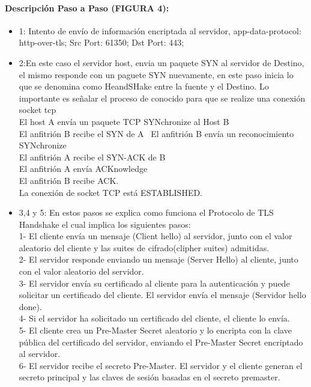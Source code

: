\documentclass[letterpaper]{article}
\begin{document}
\paragraph{Descripción Paso a Paso (FIGURA 4):}
\begin{itemize}
				
\item{1: Intento de envío de información encriptada al servidor, app-data-protocol: http-over-tls; Src Port: 61350; Dst Port: 443; }

\item{2:En este caso el servidor host, envia un paquete SYN al servidor de Destino, el mismo responde con un paguete SYN nuevamente, en este paso inicia lo que se denomina como HeandSHake entre la fuente y el Destino. Lo importante es señalar el proceso de conocido para que se realize una conexión socket tcp \\
El host A envía un paquete TCP SYNchronize al Host B \\
El anfitrión B recibe el SYN de A \
El anfitrión B envía un reconocimiento SYNchronize \\
El anfitrión A recibe el SYN-ACK de B \\
El anfitrión A envía ACKnowledge \\
El anfitrión B recibe ACK. \\
La conexión de socket TCP está ESTABLISHED. \\
}
\item{3,4 y 5: En estos pasos se explica como funciona el  Protocolo de TLS Handshake el cual implica los siguientes pasos:\\
1- El cliente envía un mensaje (Client hello) al servidor, junto con el valor aleatorio del cliente y las suites de cifrado(clipher suites) admitidas.\\
2- El servidor responde enviando un mensaje (Server Hello) al cliente, junto con el valor aleatorio del servidor.\\
3- El servidor envía su certificado al cliente para la autenticación y puede solicitar un certificado del cliente. El servidor envía el mensaje (Servidor hello done).\\
4- Si el servidor ha solicitado un certificado del cliente, el cliente lo envía.\\
5- El cliente crea un Pre-Master Secret aleatorio y lo encripta con la clave pública del certificado del servidor, enviando el Pre-Master Secret encriptado al servidor.\\
6- El servidor recibe el secreto Pre-Master. El servidor y el cliente generan el secreto principal y las claves de sesión basadas en el secreto premaster.\\
}
\end{itemize}
\end{document}
